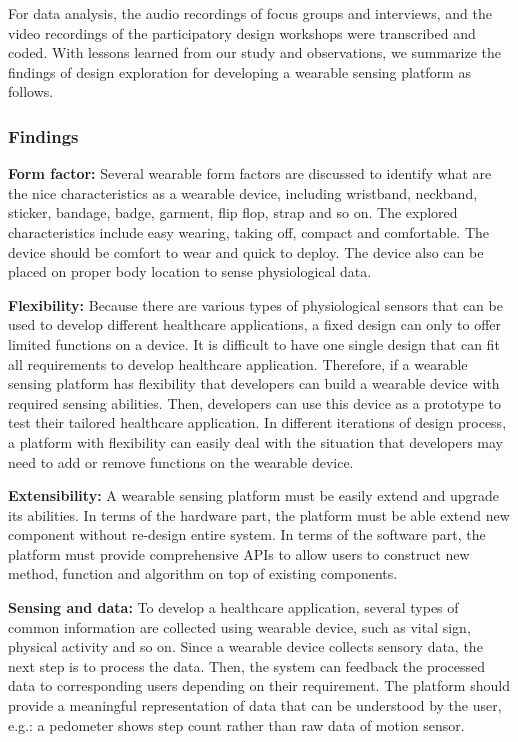 For data analysis, the audio recordings of focus groups and interviews, and the video recordings of the participatory design workshops were transcribed and coded.
With lessons learned from our study and observations, we summarize the findings of design exploration for developing a wearable sensing platform as follows.

\subsubsection{Findings}
\textbf{Form factor:}
\newline
Several wearable form factors are discussed to identify what are the nice characteristics as a wearable device, including wristband, neckband, sticker, bandage, badge, garment, flip flop, strap and so on. The explored characteristics include easy wearing, taking off, compact and comfortable. The device should be comfort to wear and quick to deploy. The device also can be placed on proper body location to sense physiological data.

\vspace{10pt}
\textbf{Flexibility:}
\newline
Because there are various types of physiological sensors that can be used to develop different healthcare applications, a fixed design can only to offer limited functions on a device. It is difficult to have one single design that can fit all requirements to develop healthcare application. Therefore, if a wearable sensing platform has flexibility that developers can build a wearable device with required sensing abilities. Then, developers can use this device as a prototype to test their tailored healthcare application. In different iterations of design process, a platform with flexibility can easily deal with the situation that developers may need to add or remove functions on the wearable device.

\vspace{10pt}
\textbf{Extensibility:}
\newline
A wearable sensing platform must be easily extend and upgrade its abilities. In terms of the hardware part, the platform must be able extend new component without re-design entire system. In terms of the software part, the platform must provide comprehensive APIs to allow users to construct new method, function and algorithm on top of existing components.

\vspace{10pt}
\textbf{Sensing and data:}
\newline
To develop a healthcare application, several types of common information are collected using wearable device, such as vital sign, physical activity and so on. Since a wearable device collects sensory data, the next step is to process the data. Then, the system can feedback the processed data to corresponding users depending on their requirement. The platform should provide a meaningful representation of data that can be understood by the user, e.g.: a pedometer shows step count rather than raw data of motion sensor.

